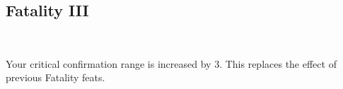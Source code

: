 \subsection*{Fatality III}\label{feat:fatality3}
 \\

Your critical confirmation range is increased by 3. This replaces the effect
of previous Fatality feats.

